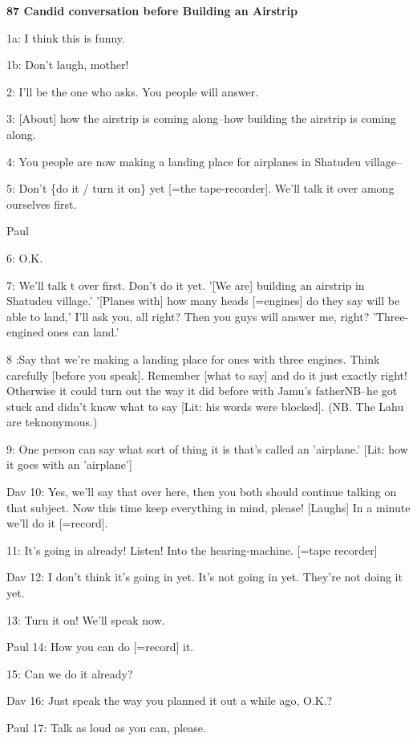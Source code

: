 
\textbf{87 Candid conversation before Building an Airstrip}

1a: I think this is funny.

1b: Don't laugh, mother!

2: I'll be the one who asks. You people will answer.

3: [About] how the airstrip is coming along--how building the airstrip is coming
along.

4: You people are now making a landing place for airplanes in Shatudeu village--

5: Don't \{do it / turn it on\} yet [=the tape-recorder]. We'll talk it over among
ourselves first.

Paul

6: O.K.

7: We'll talk t over first. Don't do it yet. '[We are] building an airstrip in
Shatudeu village.' '[Planes with] how many heads [=engines] do they say will be
able to land,' I'll ask you, all right? Then you guys will answer me, right? 'Three-engined
ones can land.'

8 :Say that we're making a landing place for ones with three engines. Think carefully
[before you speak]. Remember [what to say] and do it just exactly right! Otherwise
it could turn out the way it did before with Jamu's fatherNB--he got stuck and
didn't know what to say [Lit: his words were blocked]. (NB. The Lahu are teknonymous.)

9: One person can say what sort of thing it is that's called an 'airplane.' [Lit:
how it goes with an 'airplane']

Dav 10: Yes, we'll say that over here, then you both should continue talking on
that subject. Now this time keep everything in mind, please! [Laughs] In a minute
we'll do it [=record].

11: It's going in already! Listen! Into the hearing-machine. [=tape recorder]

Dav 12: I don't think it's going in yet. It's not going in yet. They're not doing
it yet.

13: Turn it on! We'll speak now.

Paul 14: How you can do [=record] it.

15: Can we do it already?

Dav 16: Just speak the way you planned it out a while ago, O.K.?

Paul 17: Talk as loud as you can, please.


